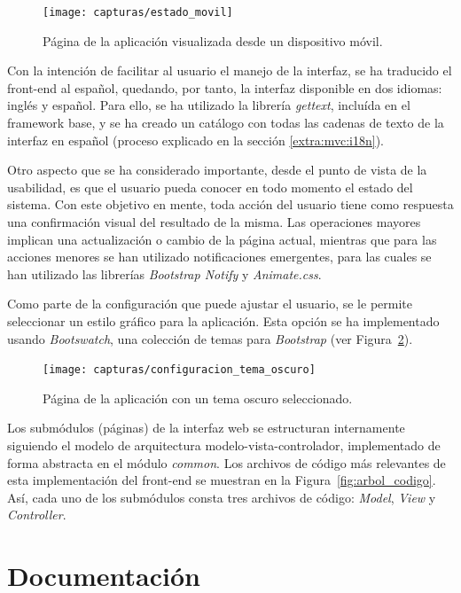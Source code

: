 \begin{figure}[!htp]
  \centering
  \texttt{[image: capturas/estado\_movil]}
  \caption{Página de la aplicación visualizada desde un dispositivo móvil.}
  \label{fig:captura:movil}
\end{figure}

Con la intención de facilitar al usuario el manejo de la interfaz, se ha traducido el \gls{front-end} al español, quedando, por tanto, la interfaz disponible en dos idiomas: inglés y español.
Para ello, se ha utilizado la librería \textit{gettext}, incluída en el \gls{framework} base, y se ha creado un catálogo con todas las cadenas de texto de la interfaz en español (proceso explicado en la sección \ref{extra:mvc:i18n}).

Otro aspecto que se ha considerado importante, desde el punto de vista de la usabilidad, es que el usuario pueda conocer en todo momento el estado del sistema.
Con este objetivo en mente, toda acción del usuario tiene como respuesta una confirmación visual del resultado de la misma.
Las operaciones mayores implican una actualización o cambio de la página actual, mientras que para las acciones menores se han utilizado notificaciones emergentes, para las cuales se han utilizado las librerías \textit{Bootstrap Notify} y \textit{Animate.css}.

Como parte de la configuración que puede ajustar el usuario, se le permite seleccionar un estilo gráfico para la aplicación.
Esta opción se ha implementado usando \textit{Bootswatch}, una colección de temas para \textit{Bootstrap} (ver Figura~\ref{fig:captura:oscuro}).

\begin{figure}[!htp]
  \centering
  \texttt{[image: capturas/configuracion\_tema\_oscuro]}
  \caption{Página de la aplicación con un tema oscuro seleccionado.}
  \label{fig:captura:oscuro}
\end{figure}

Los submódulos (páginas) de la interfaz web se estructuran internamente siguiendo el modelo de arquitectura modelo-vista-controlador, implementado de forma abstracta en el módulo \textit{common}.
Los archivos de código más relevantes de esta implementación del \gls{front-end} se muestran en la Figura~\ref{fig:arbol_codigo}.
Así, cada uno de los submódulos consta tres archivos de código: \textit{Model}, \textit{View} y \textit{Controller}.

\section{Documentación \label{sec:imp:docs}}

